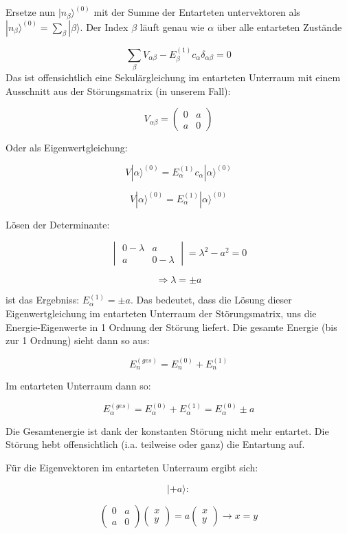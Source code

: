Ersetze nun \(|n_\beta\rangle^{(0)}\) mit der Summe der Entarteten untervektoren als \(|n_\beta\rangle^{(0)} = \sum_\beta |\beta\rangle \). Der Index \(\beta\) läuft genau wie \(\alpha\) über alle entarteten Zustände

\[\sum_\beta V_{\alpha\beta}-E_\beta^{(1)}c_\alpha  \delta_{\alpha\beta} = 0\]
Das ist offensichtlich eine Sekulärgleichung im entarteten Unterraum mit einem Ausschnitt aus der Störungsmatrix (in unserem Fall):

\[V_{\alpha\beta} = \begin{pmatrix}0&a\\ a&0 \end{pmatrix} \]

Oder als Eigenwertgleichung:


\[V|\alpha\rangle ^{(0)} = E_\alpha^{(1)}c_\alpha|\alpha\rangle ^{(0)}  \]

\[V|\alpha\rangle ^{(0)} = E_\alpha^{(1)} |\alpha\rangle ^{(0)}  \]

Lösen der Determinante:

\[\begin{vmatrix} 0-\lambda&a\\ a& 0-\lambda  \end{vmatrix} = \lambda^2-a^2 = 0 \]

\[\Rightarrow \lambda =\pm a\]

ist das Ergebniss:  \(E_\alpha^{(1)} = \pm a \).  Das bedeutet, dass die Lösung dieser Eigenwertgleichung im entarteten Unterraum der Störungsmatrix, uns die Energie-Eigenwerte in 1 Ordnung der Störung liefert. Die gesamte Energie (bis zur 1 Ordnung) sieht dann so aus:

\[E_n^{(ges)} = E_n^{(0)}+E_n^{(1)}\]

Im entarteten Unterraum dann so:

\[E_\alpha^{(ges)} = E_\alpha^{(0)}+E_\alpha^{(1)} =E_\alpha^{(0)}\pm a \]

Die Gesamtenergie ist dank der konstanten Störung nicht mehr entartet. Die Störung hebt offensichtlich (i.a. teilweise oder ganz) die Entartung auf.

Für die Eigenvektoren im entarteten Unterraum ergibt sich:

\[|+a\rangle :\]

\[\begin{pmatrix}0&a\\a&0\end{pmatrix} \begin{pmatrix}x\\y\end{pmatrix}=a\begin{pmatrix}x\\y\end{pmatrix} \rightarrow x=y\]

